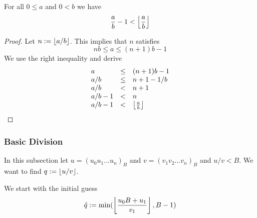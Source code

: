 \begin{theorem}\label{intdiv-theorem2}
    For all $0 \le a$ and $0 < b$ we have
    $$
        \frac{a}{b} - 1 < \left\lfloor \frac{a}{b} \right\rfloor
    $$

    \begin{proof}
        Let $n := \left\lfloor a/b \right\rfloor$. This implies that $n$ satisfies
        $$
            nb \le a \le (n + 1) b - 1
        $$
        We use the right inequality and derive
        $$
        \begin{array}{lll}
            a &\le& (n + 1) b - 1
            \\
            a/b  &\le&   n + 1 - 1/b
            \\
            a/b  &<&   n + 1
            \\
            a/b - 1  &<&   n
            \\
            a/b - 1 &<&   \left\lfloor \frac{a}{b} \right\rfloor
        \end{array}
        $$
    \end{proof}
\end{theorem}


\subsubsection{Basic Division}

In this subsection let $u = (u_0 u_1 \ldots u_n)_B$ and $v = (v_1 v_2 \ldots
v_n)_B$ and $u / v < B$.
%
We want to find $q := \left\lfloor u / v \right\rfloor$.

We start with the initial guess
$$
\hat{q} := \text{min}( \left\lfloor \frac{u_0 B + u_1}{v_1} \right\rfloor, B - 1)
$$


